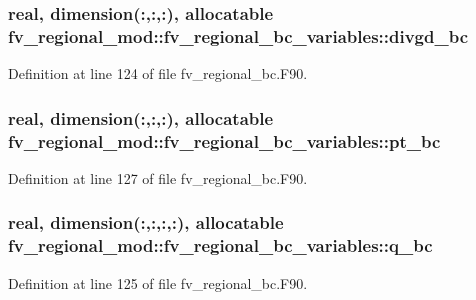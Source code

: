 \subsubsection[{divgd\-\_\-bc}]{\setlength{\rightskip}{0pt plus 5cm}real, dimension(\-:,\-:,\-:), allocatable fv\-\_\-regional\-\_\-mod\-::fv\-\_\-regional\-\_\-bc\-\_\-variables\-::divgd\-\_\-bc\hspace{0.3cm}{\ttfamily [private]}}\label{structfv__regional__mod_1_1fv__regional__bc__variables_ad0c85d1a488070404cc5f270a96f3952}


Definition at line 124 of file fv\-\_\-regional\-\_\-bc.\-F90.

\subsubsection[{pt\-\_\-bc}]{\setlength{\rightskip}{0pt plus 5cm}real, dimension(\-:,\-:,\-:), allocatable fv\-\_\-regional\-\_\-mod\-::fv\-\_\-regional\-\_\-bc\-\_\-variables\-::pt\-\_\-bc\hspace{0.3cm}{\ttfamily [private]}}\label{structfv__regional__mod_1_1fv__regional__bc__variables_aa401302803a6a0a83ed6fda6296b8c70}


Definition at line 127 of file fv\-\_\-regional\-\_\-bc.\-F90.

\subsubsection[{q\-\_\-bc}]{\setlength{\rightskip}{0pt plus 5cm}real, dimension(\-:,\-:,\-:,\-:), allocatable fv\-\_\-regional\-\_\-mod\-::fv\-\_\-regional\-\_\-bc\-\_\-variables\-::q\-\_\-bc\hspace{0.3cm}{\ttfamily [private]}}\label{structfv__regional__mod_1_1fv__regional__bc__variables_ac742d67ec3f6444358668e8621f19096}


Definition at line 125 of file fv\-\_\-regional\-\_\-bc.\-F90.

